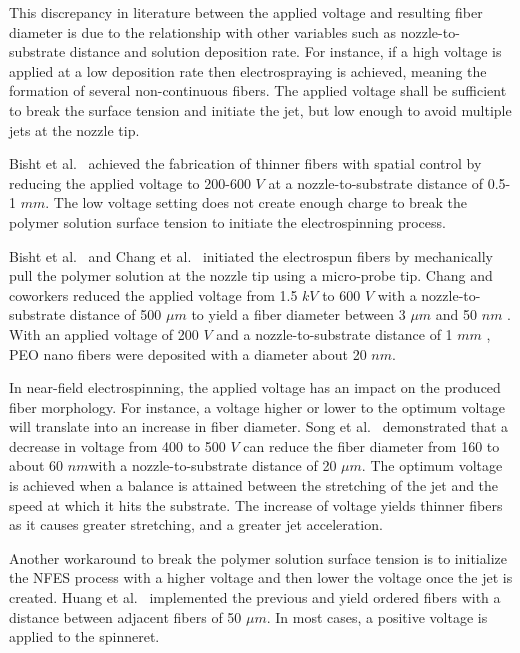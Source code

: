 \documentclass[5p,,preprint,12pt,twocolumn]{elsarticle}
\begin{document}
This discrepancy in literature between the applied voltage and resulting fiber diameter is due to the relationship with other variables such as nozzle-to-substrate distance and solution deposition rate. For instance, if a high voltage is applied at a low deposition rate then electrospraying is achieved, meaning the formation of several non-continuous fibers. The applied voltage shall be sufficient to break the surface tension and initiate the jet, but low enough to avoid multiple jets at the nozzle tip.

Bisht et al.\unskip~\cite{527120:11973130} achieved the fabrication of thinner fibers with spatial control by reducing the applied voltage to 200-600 $V $  at a nozzle-to-substrate distance of 0.5-1 $mm $. The low voltage setting does not create enough charge to break the polymer solution surface tension to initiate the electrospinning process.

Bisht et al.\unskip~\cite{527120:11973130} and Chang et al.\unskip~\cite{527120:11974306} initiated the electrospun fibers by mechanically pull the polymer solution at the nozzle tip using a micro-probe tip. Chang and coworkers reduced the applied voltage from 1.5 $kV $ to 600 $V $ with a nozzle-to-substrate distance of 500 $\mu m $ to yield a fiber diameter between 3 $\mu m $  and 50 $nm $ . With an applied voltage of 200 $V $ and a nozzle-to-substrate distance of 1 $mm $ , PEO nano fibers were deposited with a diameter about 20 $nm $.

In near-field electrospinning, the applied voltage has an impact on the produced fiber morphology. For instance, a voltage higher or lower to the optimum voltage will translate into an increase in fiber diameter. Song et al.\unskip~\cite{527120:11974320} demonstrated that a decrease in voltage from 400 to 500 $V $ can reduce the fiber diameter from 160 to about 60 $nm $with a nozzle-to-substrate distance of 20 $\mu m $. The optimum voltage is achieved when a balance is attained between the stretching of the jet and the speed at which it hits the substrate. The increase of voltage yields thinner fibers as it causes greater stretching, and a greater jet acceleration.

Another workaround to break the polymer solution surface tension is to initialize the NFES process with a higher voltage and then lower the voltage once the jet is created. Huang et al.\unskip~\cite{527120:11974311} implemented the previous and yield ordered fibers with a distance between adjacent fibers of 50 $\mu m $. In most cases, a positive voltage is applied to the spinneret.
\end{document}
